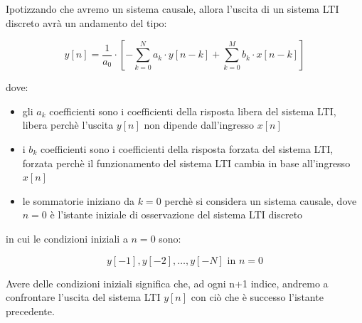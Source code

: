Ipotizzando che avremo un sistema causale, allora l'uscita di un sistema LTI discreto avrà un andamento del tipo: 

{
    \Large 
    \begin{equation}
        y \left[ n\right]
        = 
        \dfrac{1}{a_0} 
        \cdot
        \left[ 
            - \sum_{k = 0}^{N} a_k \cdot y [n - k]
            + 
            \sum_{k = 0}^{M} b_k \cdot x [n - k] 
        \right]
    \end{equation}
} 

dove: 

\begin{itemize}
    \item gli $a_k$ coefficienti sono i coefficienti della risposta libera del sistema LTI, libera perchè l'uscita $y \left[ n\right]$ non dipende dall'ingresso $x \left[ n\right]$
    \item i $b_k$ coefficienti sono i coefficienti della risposta forzata del sistema LTI, forzata perchè il funzionamento del sistema LTI cambia in base all'ingresso $x \left[ n\right]$ 
    \item le sommatorie iniziano da $k = 0$ perchè si considera un sistema causale, dove $n = 0$ è l'istante iniziale di osservazione del sistema LTI discreto
\end{itemize}

in cui le condizioni iniziali a $n = 0$ sono: 

{
    \Large 
    \begin{equation}
        y \left[ -1\right], 
        y \left[ -2\right], 
        \dots, 
        y \left[ -N\right] 
        \text{ in } n = 0 
    \end{equation}
}

Avere delle condizioni iniziali significa che, ad ogni n+1 indice, andremo a confrontare l'uscita del sistema LTI $y \left[ n\right]$ con ciò che è successo l'istante precedente. \newline 

